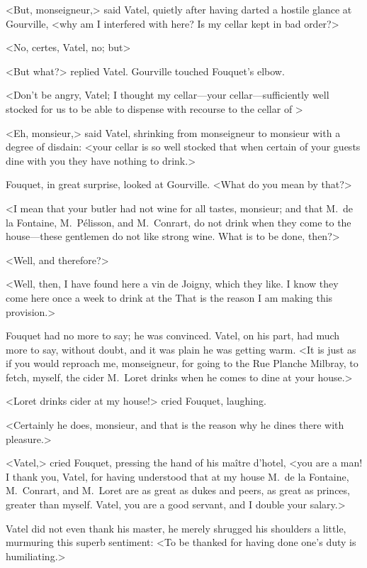 <But, monseigneur,> said Vatel, quietly after having darted a hostile glance at Gourville, <why am I interfered with here? Is my cellar kept in bad order?>

<No, certes, Vatel, no; but\longdash>

<But what?> replied Vatel. Gourville touched Fouquet's elbow.

<Don't be angry, Vatel; I thought my cellar—your cellar—sufficiently well stocked for us to be able to dispense with recourse to the cellar of >

<Eh, monsieur,> said Vatel, shrinking from monseigneur to monsieur with a degree of disdain: <your cellar is so well stocked that when certain of your guests dine with you they have nothing to drink.>

Fouquet, in great surprise, looked at Gourville. <What do you mean by that?>

<I mean that your butler had not wine for all tastes, monsieur; and that M.~de la Fontaine, M.~Pélisson, and M.~Conrart, do not drink when they come to the house—these gentlemen do not like strong wine. What is to be done, then?>

<Well, and therefore?>

<Well, then, I have found here a vin de Joigny, which they like. I know they come here once a week to drink at the  That is the reason I am making this provision.>

Fouquet had no more to say; he was convinced. Vatel, on his part, had much more to say, without doubt, and it was plain he was getting warm. <It is just as if you would reproach me, monseigneur, for going to the Rue Planche Milbray, to fetch, myself, the cider M.~Loret drinks when he comes to dine at your house.>

<Loret drinks cider at my house!> cried Fouquet, laughing.

<Certainly he does, monsieur, and that is the reason why he dines there with pleasure.>

<Vatel,> cried Fouquet, pressing the hand of his maître d'hotel, <you are a man! I thank you, Vatel, for having understood that at my house M.~de la Fontaine, M.~Conrart, and M.~Loret are as great as dukes and peers, as great as princes, greater than myself. Vatel, you are a good servant, and I double your salary.>

Vatel did not even thank his master, he merely shrugged his shoulders a little, murmuring this superb sentiment: <To be thanked for having done one's duty is humiliating.>

